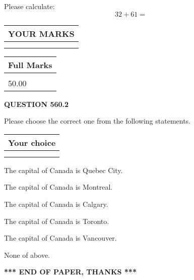 \documentclass[12pt]{article}
\begin{document}
  
 
Please calculate:
\begin{equation}
32 +  %
61 = \nonumber
\end{equation}
 

 

 
  
\vspace{0.2in}
  
\noindent\begin{tabular}{|l|}
\hline
 YOUR MARKS  \\
\hline
 \\ 
 \\ 
\hline
\end{tabular}
\hspace{0.05in} \begin{tabular}{|l|}
\hline
 Full Marks  \\
\hline
 \\ 
50.00 \\
\hline
\end{tabular}
{\textbf{\Large{QUESTION
560.2 
}}}
  
  
Please choose the correct one from the following statements.
  
  
\noindent\hspace{3.0in} \begin{tabular}{|l|}
\hline
Your choice \\
\hline
 \\ 
 \\ 
\hline
\end{tabular}
  
  
 
 
The capital of Canada is Quebec City.
 
 
The capital of Canada is Montreal.
 
 
The capital of Canada is Calgary.
 
 
The capital of Canada is Toronto.
 
 
The capital of Canada is Vancouver.
 
 
 None of above.
 
 
   
   
 \vspace{0.2in}
 
   
   
   
   
\vspace{1.0in} 
{\textbf{\large{ *** END OF PAPER, THANKS *** }}} 
   
\end{document}
